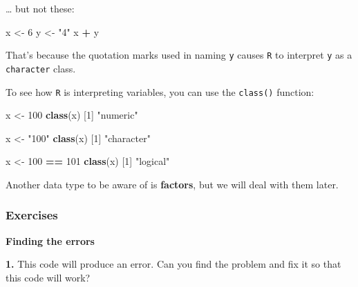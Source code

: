 \documentclass[
]{book}
\newenvironment{Shaded}{\begin{snugshade}}{\end{snugshade}}
\newcommand{\DecValTok}[1]{\textcolor[rgb]{0.00,0.00,0.81}{#1}}
\newcommand{\KeywordTok}[1]{\textcolor[rgb]{0.13,0.29,0.53}{\textbf{#1}}}
\newcommand{\NormalTok}[1]{#1}
\newcommand{\OperatorTok}[1]{\textcolor[rgb]{0.81,0.36,0.00}{\textbf{#1}}}
\newcommand{\StringTok}[1]{\textcolor[rgb]{0.31,0.60,0.02}{#1}}
\begin{document}
\ldots{} but not these:

\begin{Shaded}
\begin{Highlighting}[]
\NormalTok{x <-}\StringTok{ }\DecValTok{6}
\NormalTok{y <-}\StringTok{ "4"}
\NormalTok{x }\OperatorTok{+}\StringTok{ }\NormalTok{y}
\end{Highlighting}
\end{Shaded}

That's because the quotation marks used in naming \texttt{y} causes \texttt{R} to interpret \texttt{y} as a \texttt{character} class.

To see how \texttt{R} is interpreting variables, you can use the \texttt{class()} function:

\begin{Shaded}
\begin{Highlighting}[]
\NormalTok{x <-}\StringTok{ }\DecValTok{100}
\KeywordTok{class}\NormalTok{(x)}
\NormalTok{[}\DecValTok{1}\NormalTok{] }\StringTok{"numeric"}
\end{Highlighting}
\end{Shaded}

\begin{Shaded}
\begin{Highlighting}[]
\NormalTok{x <-}\StringTok{ "100"}
\KeywordTok{class}\NormalTok{(x)}
\NormalTok{[}\DecValTok{1}\NormalTok{] }\StringTok{"character"}
\end{Highlighting}
\end{Shaded}

\begin{Shaded}
\begin{Highlighting}[]
\NormalTok{x <-}\StringTok{ }\DecValTok{100} \OperatorTok{==}\StringTok{ }\DecValTok{101}
\KeywordTok{class}\NormalTok{(x)}
\NormalTok{[}\DecValTok{1}\NormalTok{] }\StringTok{"logical"}
\end{Highlighting}
\end{Shaded}

Another data type to be aware of is \textbf{factors}, but we will deal with them later.

\hypertarget{exercises-2}{%
\subsubsection*{Exercises}\label{exercises-2}}

\textbf{Finding the errors}

\textbf{1.} This code will produce an error. Can you find the problem and fix it so that this code will work?
\end{document}
